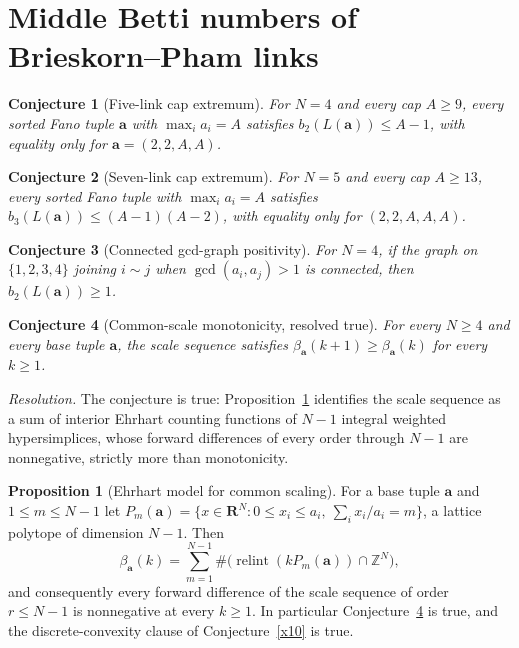 \documentclass[11pt]{article}
\newtheorem{conjecture}{Conjecture}
\theoremstyle{definition}
\newcommand{\Z}{\mathbb Z}
\providecommand{\Z}{\mathbb Z}
\newtheorem{proposition}{Proposition}
\begin{document}
\section{Middle Betti numbers of Brieskorn--Pham links}

\begin{conjecture}[Five-link cap extremum]\label{x6}
For $N=4$ and every cap $A\ge9$, every sorted Fano tuple $\mathbf a$ with $\max_ia_i=A$ satisfies $b_2(L(\mathbf a))\le A-1$, with equality only for $\mathbf a=(2,2,A,A)$.
\end{conjecture}

\begin{conjecture}[Seven-link cap extremum]\label{x7}
For $N=5$ and every cap $A\ge13$, every sorted Fano tuple with $\max_ia_i=A$ satisfies $b_3(L(\mathbf a))\le(A-1)(A-2)$, with equality only for $(2,2,A,A,A)$.
\end{conjecture}

\begin{conjecture}[Connected gcd-graph positivity]\label{x8}
For $N=4$, if the graph on $\{1,2,3,4\}$ joining $i\sim j$ when $\gcd(a_i,a_j)>1$ is connected, then $b_2(L(\mathbf a))\ge1$.
\end{conjecture}

\begin{conjecture}[Common-scale monotonicity, resolved true]\label{x9}
For every $N\ge4$ and every base tuple $\mathbf a$, the scale sequence satisfies $\beta_{\mathbf a}(k+1)\ge\beta_{\mathbf a}(k)$ for every $k\ge1$.
\end{conjecture}

\emph{Resolution.} The conjecture is true: Proposition~\ref{x:ehrhart} identifies the scale sequence as a sum of interior Ehrhart counting functions of $N-1$ integral weighted hypersimplices, whose forward differences of every order through $N-1$ are nonnegative, strictly more than monotonicity.

\begin{proposition}[Ehrhart model for common scaling]\label{x:ehrhart}
For a base tuple $\mathbf a$ and $1\le m\le N-1$ let $P_m(\mathbf a)=\{x\in\mathbf R^N:0\le x_i\le a_i,\ \sum_ix_i/a_i=m\}$, a lattice polytope of dimension $N-1$.  Then
\[
\beta_{\mathbf a}(k)=\sum_{m=1}^{N-1}\#\bigl(\operatorname{relint}(kP_m(\mathbf a))\cap\Z^N\bigr),
\]
and consequently every forward difference of the scale sequence of order $r\le N-1$ is nonnegative at every $k\ge1$.  In particular Conjecture~\ref{x9} is true, and the discrete-convexity clause of Conjecture~\ref{x10} is true.
\end{proposition}
\end{document}
